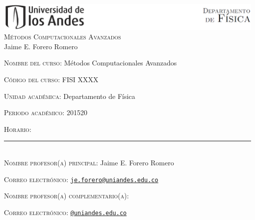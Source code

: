 \documentclass[letterpaper,10pt,onecolumn]{article}
\begin{document}
\begin{center}

\includegraphics[width=490pt]{header.png}\\[0.5cm]

\textsc{\LARGE M\'etodos Computacionales Avanzados}\\[0.1cm]

\large Jaime E. Forero Romero\\[0.5cm]

\end{center}

\large \noindent\textsc{Nombre del curso:}  M\'etodos Computacionales Avanzados%
  
\noindent\textsc{C\'odigo del curso:} FISI XXXX %

\noindent\textsc{Unidad acad\'emica:} Departamento de F\'isica

\noindent\textsc{Periodo acad\'emico:} 201520 %

\noindent\textsc{Horario:} %

\noindent\rule{\textwidth}{1pt}\\[-0.3cm]

\normalsize \noindent\textsc{Nombre profesor(a) principal:} Jaime
E. Forero Romero%

\noindent\textsc{Correo electr\'onico:}
\href{mailto:je.forero@uniandes.edu.co}{\nolinkurl{je.forero@uniandes.edu.co}}


\noindent\textsc{Nombre profesor(a) complementario(a):} %

\noindent\textsc{Correo electr\'onico:}
\href{mailto:@uniandes.edu.co}{\nolinkurl{@uniandes.edu.co}}

\end{document}
